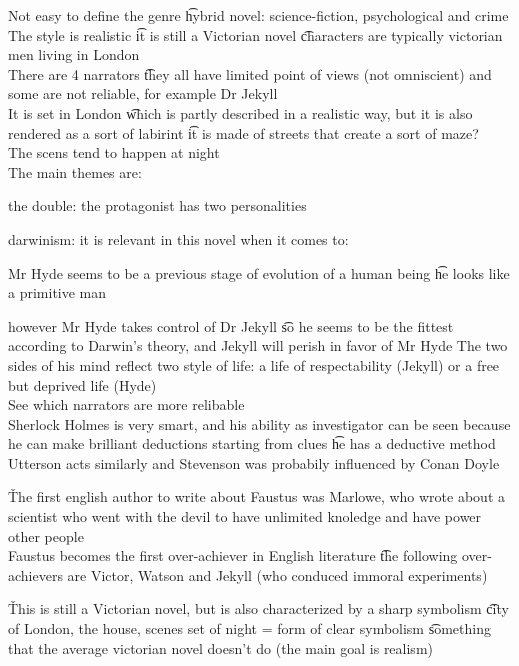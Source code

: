 \documentclass[12pt]{article}
\begin{document}
\s[Wrap up]
Not easy to define the genre \t hybrid novel: science-fiction, psychological and crime \\
The style is realistic \t it is still a Victorian novel \t characters are typically victorian men living in London \\
There are 4 narrators \t they all have limited point of views (not omniscient) and some are not reliable, for example Dr Jekyll \\
It is set in London \t which is partly described in a realistic way, but it is also rendered as a sort of labirint \t it is made of streets that create a sort of maze? \\
The scens tend to happen at night \\
The main themes are:
\bi
  \item the double: the protagonist has two personalities
  \item darwinism: it is relevant in this novel when it comes to:
    \bi
      \item Mr Hyde seems to be a previous stage of evolution of a human being \t he looks like a primitive man
      \item however Mr Hyde takes control of Dr Jekyll \t so he seems to be the fittest according to Darwin's theory, and Jekyll will perish in favor of Mr Hyde
    \ei
\ei
The two sides of his mind reflect two style of life: a life of respectability (Jekyll) or a free but deprived life (Hyde) \\
See which narrators are more relibable \\
Sherlock Holmes is very smart, and his ability as investigator can be seen because he can make brilliant deductions starting from clues \t he has a deductive method \\
Utterson acts similarly and Stevenson was probabily influenced by Conan Doyle

\v

The first english author to write about Faustus was Marlowe, who wrote about a scientist who went with the devil to have unlimited knoledge and have power other people \\
Faustus becomes the first over-achiever in English literature \t the following over-achievers are Victor, Watson and Jekyll (who conduced immoral experiments)

\v

This is still a Victorian novel, but is also characterized by a sharp symbolism \t city of London, the house, scenes set of night = form of clear symbolism \t something that the average victorian novel doesn't do (the main goal is realism)
\end{document}
